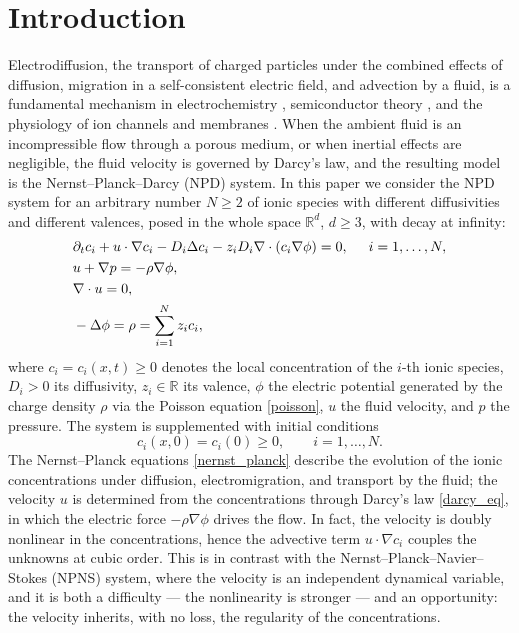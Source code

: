 \documentclass[11pt,reqno]{amsart}
\newcommand{\na}{\nabla}
\begin{document}
\section{Introduction}
Electrodiffusion, the transport of charged particles under the
combined effects of diffusion, migration in a self-consistent electric
field, and advection by a fluid, is a fundamental mechanism in
electrochemistry \cite{lee2016membrane}, semiconductor theory \cite{biler1994debye, gajewski1986basic}, and the physiology of ion
channels and membranes \cite{gao2014high, yang2019review, davidson2016dynamical, goldman1989electrodiffusion, qian1989electro}. When the
ambient fluid is an incompressible flow through a porous medium, or
when inertial effects are negligible, the fluid velocity is governed
by Darcy's law, and the resulting model is the
Nernst--Planck--Darcy (NPD) system. In this paper we consider the NPD
system for an arbitrary number $N \ge 2$ of ionic species with
different diffusivities and different valences, posed in the whole
space $\mathbb{R}^d$, $d \ge 3$, with decay at infinity:
\begin{align}
    &\partial_t c_i + u \cdot \na c_i - D_i \Delta c_i - z_i D_i \na  \cdot (c_i \na \phi) = 0, \hspace{0.5cm} i =1, \dots, N,\label{nernst_planck} \\
    &u + \nabla p = -\rho \nabla \phi, \label{darcy_eq} \\
    &\na \cdot u = 0,\label{div_free_eq}  \\
    &-\Delta \phi = \rho = \sum\limits_{i=1}^{N} z_ic_i \label{poisson},
\end{align} 
where $c_i = c_i(x,t) \ge 0$ denotes the local concentration of the
$i$-th ionic species, $D_i > 0$ its diffusivity, $z_i \in \mathbb{R}$
its valence, $\phi$ the electric potential generated by the charge
density $\rho$ via the Poisson equation \eqref{poisson}, $u$ the
fluid velocity, and $p$ the pressure. The system is supplemented with
initial conditions
\begin{equation}\label{eq:data}
  c_i(x, 0) = c_i(0) \ge 0, \qquad i = 1, \dots, N.
\end{equation}
The Nernst--Planck equations \eqref{nernst_planck} describe the evolution of
the ionic concentrations under diffusion, electromigration, and
transport by the fluid; the velocity $u$ is determined from the
concentrations through Darcy's law \eqref{darcy_eq}, in which the
electric force $-\rho \nabla \phi$ drives the flow. In fact, the velocity is
doubly nonlinear in the concentrations, hence the
advective term $u \cdot \nabla c_i$ couples the unknowns at cubic
order. This is in contrast with the Nernst--Planck--Navier--Stokes
(NPNS) system, where the velocity is an independent dynamical
variable, and it is both a difficulty --- the nonlinearity is stronger
--- and an opportunity: the velocity inherits, with no loss, the
regularity  of the concentrations.
\end{document}
